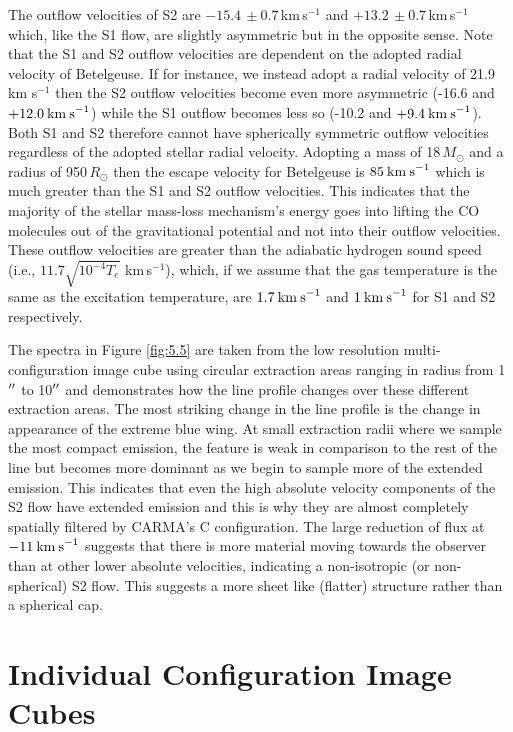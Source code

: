 The outflow velocities of S2 are $-15.4\,\pm 0.7\,$km\,s$^{-1}$ and $+13.2\,\pm 0.7\,$km\,s$^{-1}$ which, like the S1 flow, are slightly asymmetric but in the opposite sense. Note that the S1 and S2 outflow velocities are dependent on the adopted radial velocity of Betelgeuse. If for instance, we instead adopt a radial velocity of 21.9 km s${}^{-1}$ \citep{famaey_2005} then the S2 outflow velocities become even more asymmetric (-16.6 and $+12.0\>{\rm km\>s}^{-1}$) while the S1 outflow becomes less so (-10.2 and $+9.4\>{\rm km\>s}^{-1}$). Both S1 and S2 therefore cannot have spherically symmetric outflow velocities regardless of the adopted stellar radial velocity. Adopting a mass of 18\,$M_{\odot}$ \citep{meynet_2003} and a radius of 950\,$R_{\odot}$ \citep{harper_2008} then the escape velocity for Betelgeuse is $85\>{\rm km\>s}^{-1}$ which is much greater than the S1 and S2 outflow velocities. This indicates that the majority of the stellar mass-loss mechanism's energy goes into lifting the CO molecules out of the gravitational potential and not into their outflow velocities. These outflow velocities are greater than the adiabatic hydrogen sound speed (i.e., $11.7\sqrt{10^{-4}T_{e}}$ km\,s$^{-1}$), which, if we assume that the gas temperature is the same as the excitation temperature, are $1.7\>{\rm km\>s}^{-1}$ and $1\>{\rm km\>s}^{-1}$ for S1 and S2 respectively. 

The spectra in Figure \ref{fig:5.5} are taken from the low resolution multi-configuration image cube using circular extraction areas ranging in radius from 1$^{\prime\prime}$ to 10$^{\prime\prime}$ and demonstrates how the line profile changes over these different extraction areas. The most striking change in the line profile is the change in appearance of the extreme blue wing. At small extraction radii where we sample the most compact emission, the feature is weak in comparison to the rest of the line but becomes more dominant as we begin to sample more of the extended emission. This indicates that even the high absolute velocity components of the S2 flow have extended emission and this is why they are almost completely spatially filtered by CARMA's C configuration. The large reduction of flux at $-11\>{\rm km\>s}^{-1}$ suggests that there is more material moving towards the observer than at other lower absolute velocities, indicating a non-isotropic (or non-spherical) S2 flow. This suggests a more sheet like (flatter) structure rather than a spherical cap.

\section{Individual Configuration Image Cubes}\label{sec:5.4}

